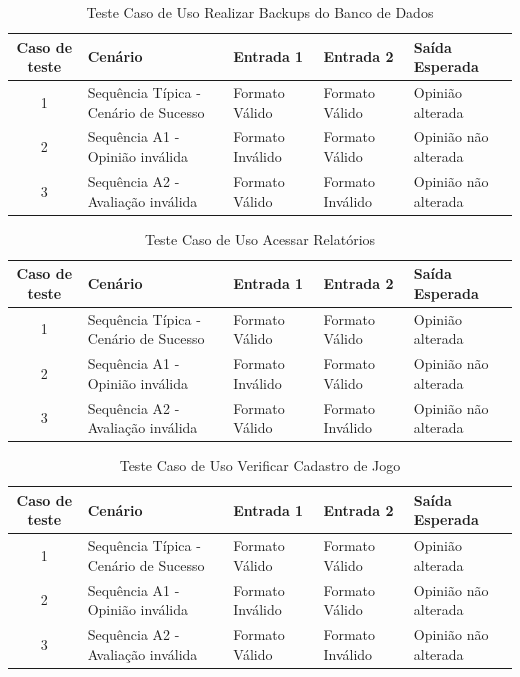 \documentclass[a4paper,11pt]{article}
\begin{document}
	\begin{center}
	\begin{table}[H]
		\begin{tabularx}{\textwidth}{c|X|X|X|X}
			\textbf{Caso de teste} & \textbf{Cenário} & \textbf{Entrada 1} & \textbf{Entrada 2} & \textbf{Saída Esperada} \\
			\hline
			1 & Sequência Típica - Cenário de Sucesso & Formato Válido & Formato Válido & Opinião alterada\\ \hline
			2 & Sequência A1 - Opinião inválida & Formato Inválido & Formato Válido & Opinião não alterada\\ \hline
			3 & Sequência A2 - Avaliação inválida & Formato Válido & Formato Inválido & Opinião não alterada\\ \hline
			
		\end{tabularx}
		\caption{Teste Caso de Uso Realizar Backups do Banco de Dados}
	\end{table}
	\end{center}
	
	\begin{center}
	\begin{table}[H]
		\begin{tabularx}{\textwidth}{c|X|X|X|X}
			\textbf{Caso de teste} & \textbf{Cenário} & \textbf{Entrada 1} & \textbf{Entrada 2} & \textbf{Saída Esperada} \\
			\hline
			1 & Sequência Típica - Cenário de Sucesso & Formato Válido & Formato Válido & Opinião alterada\\ \hline
			2 & Sequência A1 - Opinião inválida & Formato Inválido & Formato Válido & Opinião não alterada\\ \hline
			3 & Sequência A2 - Avaliação inválida & Formato Válido & Formato Inválido & Opinião não alterada\\ \hline
			
		\end{tabularx}
		\caption{Teste Caso de Uso Acessar Relatórios}
	\end{table}
	\end{center}
	
	\begin{center}
	\begin{table}[H]
		\begin{tabularx}{\textwidth}{c|X|X|X|X}
			\textbf{Caso de teste} & \textbf{Cenário} & \textbf{Entrada 1} & \textbf{Entrada 2} & \textbf{Saída Esperada} \\
			\hline
			1 & Sequência Típica - Cenário de Sucesso & Formato Válido & Formato Válido & Opinião alterada\\ \hline
			2 & Sequência A1 - Opinião inválida & Formato Inválido & Formato Válido & Opinião não alterada\\ \hline
			3 & Sequência A2 - Avaliação inválida & Formato Válido & Formato Inválido & Opinião não alterada\\ \hline
			
		\end{tabularx}
		\caption{Teste Caso de Uso Verificar Cadastro de Jogo}
	\end{table}
	\end{center}
	
\end{document}
